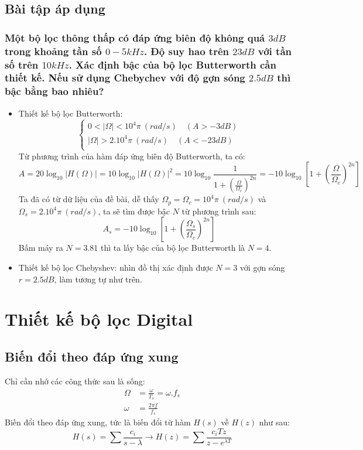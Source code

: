\documentclass{article}
\begin{document}
\subsection{Bài tập áp dụng}
\subsubsection{Một bộ lọc thông thấp có đáp ứng biên độ không quá $3dB$ trong khoảng tần số
$0-5kHz$. Độ suy hao trên $23dB$ với tần số trên $10kHz$. Xác định bậc của bộ lọc
Butterworth cần thiết kế. Nếu sử dụng Chebychev với độ gợn sóng $2.5dB$ thì bậc
bằng bao nhiêu?}
\begin{itemize}
  \item Thiết kế bộ lọc Butterworth:
  \begin{equation*}
    \begin{cases}
      0<|\Omega|<10^4\pi \:(rad/s)\quad(A>-3dB) \\ 
       |\Omega|>2.10^4\pi \:(rad/s)\quad(A<-23dB)\\
    \end{cases}
  \end{equation*}
  Từ phương trình của hàm đáp ứng biên độ Butterworth, ta có:
  $$A=20\log_{10}\left|H(\Omega)\right|=10\log_{10}|H(\Omega)|^2=10\log_{10}\frac{1}{1+\left(\frac{\Omega}{\Omega_{c}}\right)^{2n}}=-10\log_{10}\left[1+\left(\frac{\Omega}{\Omega_{c}}\right)^{2n}\right]$$
  Ta đã có từ dữ liệu của đề bài, dễ thấy $\Omega_{p}=\Omega_{c}=10^4\pi\:(rad/s)$ và $\Omega_{s}=2.10^4\pi\:(rad/s)$, ta sẽ tìm được bậc $N$ từ phương trình sau:
  $$A_{s}=-10\log_{10}\left[1+\left(\frac{\Omega_{s}}{\Omega_{c}}\right)^{2n}\right]$$
  Bấm máy ra $N=3.81$ thì ta lấy bậc của bộ lọc Butterworth là $N=4$.
  \item Thiết kế bộ lọc Chebyshev: nhìn đồ thị xác định được $N=3$ với gợn sóng $r=2.5dB$, làm tương tự như trên.
\end{itemize}
\section{Thiết kế bộ lọc Digital}
\subsection{Biến đổi theo đáp ứng xung}
Chỉ cần nhớ các công thức sau là sống:
\begin{equation*}
  \begin{split}
  \Omega&=\frac{\omega}{T_{s}}=\omega.f_{s}\\
  \omega&=\frac{2\pi f}{f_{{s}}}
  \end{split}
\end{equation*}
Biến đổi theo đáp ứng xung, tức là biến đổi từ hàm $H(s)$ về $H(z)$ như sau:
$$H(s)=\sum\frac{c_{i}}{s-\lambda}\to H(z)=\sum\frac{c_{i}Tz}{z-e^{\lambda T}}$$
\end{document}
